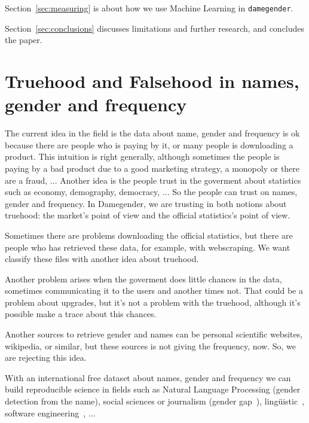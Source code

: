 \documentclass[a4paper]{article}
\begin{document}
Section~\ref{sec:measuring} is about how we use Machine Learning in
\texttt{damegender}.

Section~\ref{sec:conclusions} discusses limitations and further
research, and concludes the paper.

\section{Truehood and Falsehood in names, gender and frequency}
\label{sec:truehood}

The current idea in the field is the data about name, gender and
frequency is ok because there are people who is paying by it, or many
people is downloading a product. This intuition is right generally,
although sometimes the people is paying by a bad product due to a good
marketing strategy, a monopoly or there are a fraud, ... Another idea
is the people trust in the goverment about statistics such as economy,
demography, democracy, ... So the people can trust on names, gender
and frequency. In Damegender, we are trusting in both notions about
truehood: the market's point of view and the official statistics's
point of view.

Sometimes there are problems downloading the official statistics, but
there are people who has retrieved these data, for example, with
webscraping. We want classify these files with another idea about
truehood.

Another problem arises when the goverment does little chances in the
data, sometimes communicating it to the users and another times
not. That could be a problem about upgrades, but it's not a problem
with the truehood, although it's possible make a trace about this
chances.

Another sources to retrieve gender and names can be personal
scientific websites, wikipedia, or similar, but these sources is not
giving the frequency, now. So, we are rejecting this idea. 

With an international free dataset about names, gender and frequency
we can build reproducible science in fields such as Natural Language
Processing (gender detection from the name), social sciences or
journalism (gender
gap~\cite{holman2018gender,mislove2011understanding,niemi2017gendered,de2014genero}),
lingüistic~\cite{lawson2005russian,krueger1962mongolian,van2020gender,agyekum2006sociolinguistic,fraser1987lexicon},
software engineering~\cite{vasilescu2012gender}, ...

\end{document}
